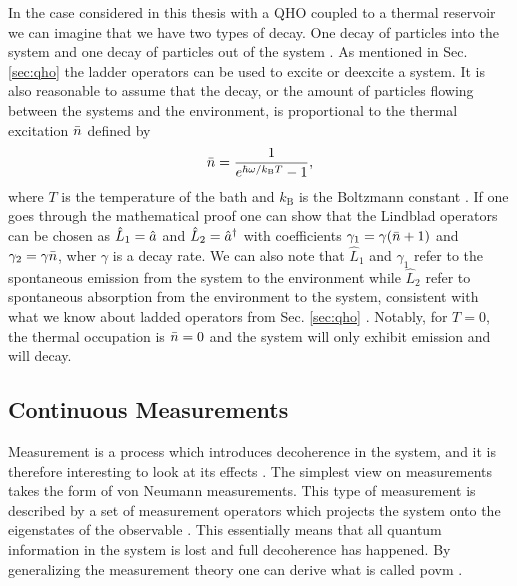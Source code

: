 In the case considered in this thesis with a QHO coupled to a thermal reservoir we can imagine that we have two types of decay. One decay of particles into the system and one decay of particles out of the system \cite{Meystre:2021}. As mentioned in Sec. \ref{sec:qho} the ladder operators can be used to excite or deexcite a system. It is also reasonable to assume that the decay, or the amount of particles flowing between the systems and the environment, is proportional to the thermal excitation $\bar{n}$ defined by
\begin{equation}
    \bar{n} = \frac{1}{e^{\hbar\omega/ k_\mathrm{B}T} - 1},
\end{equation}
where $T$ is the temperature of the bath and $k_\mathrm{B}$ is the Boltzmann constant \cite{Meystre:2021}. If one goes through the mathematical proof one can show that the Lindblad operators can be chosen as $\hat{L}_1 = \hat{a}$ and $\hat{L}_2 = \hat{a}^{\dagger}$ with coefficients $\gamma_1 = \gamma(\bar{n} + 1)$ and $\gamma_2 = \gamma \bar{n}$, wher $\gamma$ is a decay rate. We can also note that $\hat{L}_1$ and $\gamma_1$ refer to the spontaneous emission from the system to the environment while $\hat{L}_2$ refer to spontaneous absorption from the environment to the system, consistent with what we know about ladded operators from Sec. \ref{sec:qho} \cite{Meystre:2021}. Notably, for $T=0$, the thermal occupation is $\bar{n} = 0$ and the system will only exhibit emission and will decay.


\subsection{Continuous Measurements}
Measurement is a process which introduces decoherence in the system, and it is therefore interesting to look at its effects \cite{Jordan:2024}. The simplest view on measurements takes the form of von Neumann measurements. This type of measurement is described by a set of measurement operators which projects the system onto the eigenstates of the observable \cite{Annby-Andersson:2024}. This essentially means that all quantum information in the system is lost and full decoherence has happened. By generalizing the measurement theory one can derive what is called \gls{povm} \cite{Annby-Andersson:2024}.


